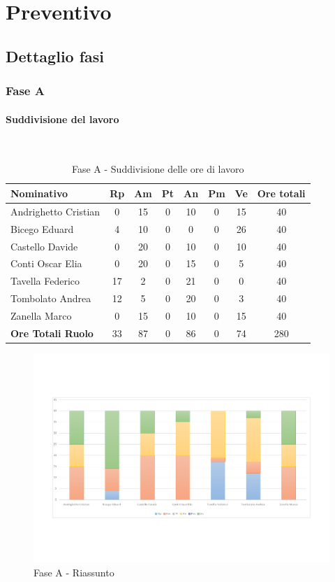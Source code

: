 \documentclass[../PianoProgetto.tex]{subfiles}
\begin{document}
	\section{Preventivo}
		\subsection{Dettaglio fasi}
			\subsubsection{Fase A}
				\paragraph{Suddivisione del lavoro}\
	\begin{table}[H]
		\begin{tabularx}{\textwidth}{l  * {6}{C}  c}
			\toprule
			\textbf{Nominativo} & \textbf{Rp} & \textbf{Am} & \textbf{Pt} 
						& \textbf{An} & \textbf{Pm} & \textbf{Ve} & \textbf{Ore totali} \\
			\midrule
			Andrighetto Cristian & 0 & 15 &	0 &	10 & 0 & 15 & 40 \\
			Bicego Eduard & 4 & 10 & 0 & 0 & 0 & 26 & 40 \\
			Castello Davide &	0 &	20 & 0 & 10 & 0 & 10 & 40 \\
			Conti Oscar Elia & 0 & 20 &	0 &	15 & 0 & 5 & 40 \\
			Tavella Federico &	17 & 2 & 0 & 21 & 0 & 0 & 40 \\
			Tombolato Andrea & 12 & 5 &	0 &	20 & 0 & 3 & 40 \\
			Zanella Marco & 0 & 15 & 0 & 10 & 0 & 15 & 40 \\
			\midrule			
			\textbf{Ore Totali Ruolo} & 33 & 87 & 0 & 86 &	0 &	74 & 280 \\
			\bottomrule
		\end{tabularx}
		\caption{Fase A - Suddivisione delle ore di lavoro}
		\label{tab:faseA_ore}
	\end{table}
	\vfill
	\begin{figure}[H]
		\centering
		\includegraphics[width=\textwidth, trim=2cm 4cm 2cm 4cm]{grafici/A/A-ore-persona}
			\caption{Fase A - Riassunto}
		\label{fig:BarChart-faseA_ore}
	\end{figure}	
	
\end{document}
